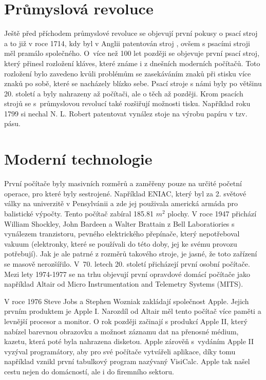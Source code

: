 \section{Průmyslová revoluce}

Ještě před příchodem průmyslové revoluce se objevují první pokusy o psací stroj a to již v roce 1714, kdy byl v Anglii patentován stroj
 \cite{FirstTypewriter}, ovšem s psacími stroji měl pramálo společného. O~více než 100 let později se
objevuje první psací stroj, který přinesl rozložení kláves, které známe i z dnešních moderních počítačů. Toto rozložení bylo zavedeno kvůli
problémům se zasekáváním znaků při stisku více znaků po sobě, které se nacházely blízko sebe. Psací stroje s námi byly po většinu 20. století
a byly nahrazeny až počítači, ale o těch až později. Krom psacích strojů se s~průmyslovou revolucí také rozšiřují možnosti tisku. Například roku 1799
si nechal N. L. Robert patentovat vynález stoje na výrobu papíru v tzv.  pásu. \cite{Papir}

\section{Moderní technologie}

První počítače byly masivních rozměrů a zaměřeny pouze na určité početní operace, pro které byly sestrojené. Například ENIAC, který byl za 2.
světové války na univerzitě v Pensylvánii a zde jej použivala americká armáda pro balistické výpočty. Tento počítač zabíral 185.81 $ m^2 $ plochy. \cite{historyComp} V roce
1947 přichází William Shockley, John Bardeen a Walter Brattain z Bell Laboratiories s vynálezem tranzistoru, pevného elektrického přepínače, který nepotřeboval
vakuum \cite{liveScience} (elektronky, které se používali do této doby, jej ke svému provozu potřebují). Jak je ale patrné z rozměrů takového stroje, je jasné,
že toto zařízení se masově nerozšířilo. V~70. letech 20. století přicházejí první osobní počítače. Mezi lety 1974-1977 se na trhu objevují
první opravdové domácí počítače jako například Altair od Micro Instrumentation and Telemetry Systems (MITS). \cite{liveScience}

V roce 1976 Steve Jobs a Stephen Wozniak zakládají společnost Apple. Jejich prvním produktem je Apple I. Narozdíl od Altair měl tento počítač více paměti a levnější
procesor a monitor. O rok později začinají s produkcí Apple II, který nabízel barevnou obrazovku a možnost záznamu dat na přenosné médium, kazetu, která poté byla
nahrazena disketou. Apple zárověň s~vydáním Apple II vyzýval programátory, aby pro své počítače vytvářeli aplikace, díky tomu například vznikl první tabulkový program
nazývaný VisiCalc. Apple tak našel cestu nejen do domácností, ale i do firemního sektoru. \cite{liveScience}
 \cite{liveScience}

